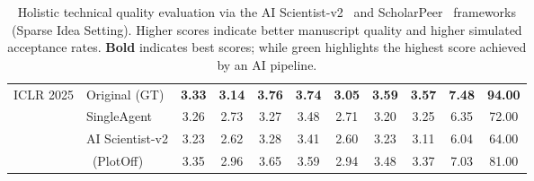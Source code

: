 \begin{table}[tbp]
{\begin{tabular}{llccccccccc}
        \midrule
        \multirow{4}{*}{ICLR 2025} 
        & Original (GT)   & \textbf{3.33} & \textbf{3.14} & \textbf{3.76} & \textbf{3.74} & \textbf{3.05} & \textbf{3.59} & \textbf{3.57} & \textbf{7.48} & \textbf{94.00} \\
        \cmidrule{2-11}
        & SingleAgent     & 3.26 & 2.73 & 3.27 & 3.48 & 2.71 & 3.20 & 3.25 & 6.35 & 72.00 \\
        & AI Scientist-v2 & 3.23 & 2.62 & 3.28 & 3.41 & 2.60 & 3.23 & 3.11 & 6.04 & 64.00 \\
        & \ourmethod{}~(PlotOff)     & \cellcolor{best_color}3.35 & \cellcolor{best_color}2.96 & \cellcolor{best_color}3.65 &\cellcolor{best_color}3.59 & \cellcolor{best_color}2.94 & \cellcolor{best_color}3.48 & \cellcolor{best_color}3.37 & \cellcolor{best_color}7.03 & \cellcolor{best_color}81.00 \\
        \bottomrule
    \end{tabular}
    }
  \caption{Holistic technical quality evaluation via the AI Scientist-v2~\citep{yamada2025aiscientistv2} and ScholarPeer~\citep{goyal2026scholarpeer} frameworks (Sparse Idea Setting). Higher scores indicate better manuscript quality and higher simulated acceptance rates. \textbf{Bold} indicates best scores; while \colorbox{best_color}{green} highlights the highest score achieved by an AI pipeline.}
  \label{tab:combined_reviewer_quality}
\end{table}